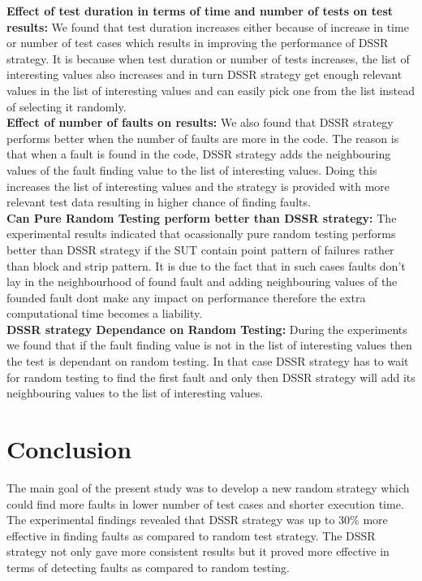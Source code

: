 \documentclass[10pt, conference, compsocconf]{IEEEtran}
\begin{document}
\textbf{Effect of test duration in terms of time and number of tests on test results:} 
We found that test duration increases either because of  increase in time or number of test cases which results in improving the performance of DSSR strategy. It is because when test duration or number of tests increases, the list of interesting values also increases and in turn DSSR strategy get enough relevant values in the list of interesting values and can easily pick one from the list instead of selecting it randomly.\\

\textbf{Effect of number of faults on results:} 
We also found that DSSR strategy performs better when the number of faults are more in the code. The reason is that when a fault is found in the code, DSSR strategy adds the neighbouring values of the fault finding value to the list of interesting values. Doing this increases the list of interesting values and the strategy is provided with more relevant test data resulting in higher chance of finding faults.\\

\textbf{Can Pure Random Testing perform better than DSSR strategy:}
The experimental results indicated that ocassionally pure random testing performs better than DSSR strategy if the SUT contain point pattern of failures rather than block and strip pattern. It is due to the fact that in such cases faults don't lay in the neighbourhood of found fault and adding neighbouring values of the founded fault dont make any impact on performance therefore the extra computational time becomes a liability.\\

\textbf{DSSR strategy Dependance on Random Testing:}
During the experiments we found that if the fault finding value is not in the list of interesting values then the test is dependant on random testing. In that case DSSR strategy has to wait for random testing to find the first fault and only then DSSR strategy will add its neighbouring values to the list of interesting values.


\section{Conclusion}

The main goal of the present study was to develop a new random strategy which could find more faults in lower number of test cases and shorter execution time. The experimental findings revealed that DSSR strategy was up to 30\% more effective in finding faults as compared to random test strategy. The DSSR strategy not only gave more consistent results but it proved more effective in terms of detecting faults as compared to random testing. \\
\end{document}
